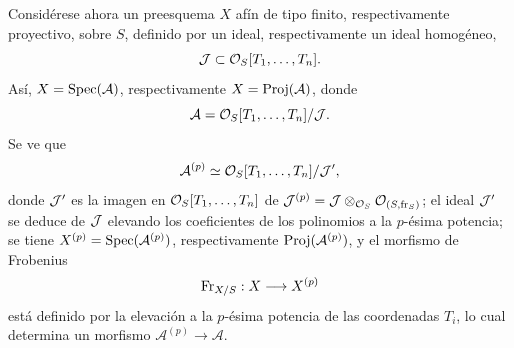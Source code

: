 Considérese ahora un preesquema $X$ afín de tipo finito, respectivamente proyectivo, sobre $S$, definido por un ideal, respectivamente un ideal homogéneo,
\[
\mathcal J\subset \mathcal{O}_S[T_1,\ldots,T_n].
\]
Así, $X=\operatorname{Spec}(\mathcal{A})$, respectivamente $X=\operatorname{Proj}(\mathcal{A})$, donde
\[
\mathcal{A}=\mathcal{O}_S[T_1,\ldots,T_n]/\mathcal J.
\]
Se ve que
\[
\mathcal{A}^{(p)}\simeq \mathcal{O}_S[T_1,\ldots,T_n]/\mathcal J',
\]
donde $\mathcal J'$ es la imagen en $\mathcal{O}_S[T_1,\ldots,T_n]$ de $\mathcal J^{(p)}=\mathcal J\otimes_{\mathcal{O}_S}\mathcal{O}_{(S,\operatorname{fr}_S)}$; el ideal $\mathcal J'$ se deduce de $\mathcal J$ elevando los coeficientes de los polinomios a la $p$-ésima potencia; se tiene $X^{(p)}=\operatorname{Spec}(\mathcal{A}^{(p)})$, respectivamente $\operatorname{Proj}(\mathcal{A}^{(p)})$, y el morfismo de Frobenius
\[
\operatorname{Fr}_{X/S}:X\longrightarrow X^{(p)}
\]
está definido por la elevación a la $p$-ésima potencia de las coordenadas $T_i$, lo cual determina un morfismo $\mathcal{A}^{(p)}\to\mathcal{A}$.
